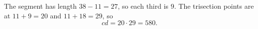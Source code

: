 The segment has length $38-11=27$, so each third is $9$. The trisection points are at $11+9=20$ and $11+18=29$, so
\[
cd=20\cdot29=\boxed{580}.
\]
